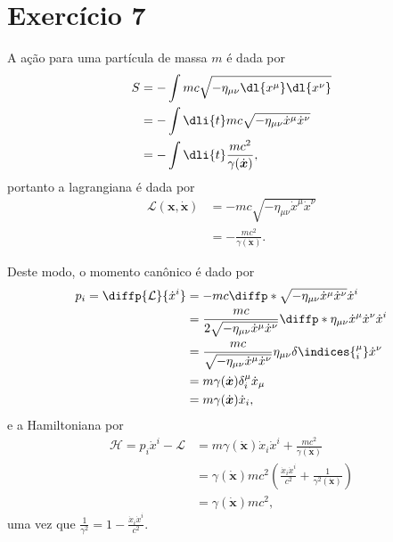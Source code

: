 \section*{Exercício 7}

A ação para uma partícula de massa \(m\) é dada por
\begin{align*}
    S &= -\int mc\sqrt{-\eta_{\mu\nu} \dl{x^\mu} \dl{x^\nu}}\\
      &= - \int \dli{t}mc \sqrt{-\eta_{\mu\nu} \dot{x}^\mu \dot{x}^\nu}\\
      &= - \int \dli{t} \frac{mc^2}{\gamma(\dot{\boldsymbol{x}})},
\end{align*}
portanto a lagrangiana é dada por
\begin{align*}
    \mathcal{L}(\boldsymbol{x}, \dot{\boldsymbol{x}}) &= - mc\sqrt{-\eta_{\mu\nu}\dot{x}^\mu\dot{x}^\nu}\\
                                        &= - \frac{mc^2}{\gamma(\dot{\boldsymbol{x}})}.
\end{align*}

Deste modo, o momento canônico é dado por
\begin{align*}
    p_i = \diffp{\mathcal{L}}{\dot{x}^i} &= -mc\diffp*{\sqrt{-\eta_{\mu\nu}\dot{x}^\mu\dot{x}^\nu}}{\dot{x}^i}\\
                                         &= \frac{mc}{2\sqrt{-\eta_{\mu\nu}\dot{x}^\mu \dot{x}^\nu}}\diffp*{\eta_{\mu\nu}\dot{x}^\mu\dot{x}^\nu}{\dot{x}^i}\\
                                         &= \frac{mc}{\sqrt{-\eta_{\mu\nu}\dot{x}^\mu\dot{x}^\nu}} \eta_{\mu\nu} \delta\indices{^\mu_i} \dot{x}^\nu\\
                                         &= m\gamma(\dot{\boldsymbol{x}}) \delta^\mu_i \dot{x}_\mu\\
                                         &= m \gamma(\dot{\boldsymbol{x}}) \dot{x}_i,
\end{align*}
e a Hamiltoniana por
\begin{align*}
    \mathcal{H} = p_i\dot{x}^i - \mathcal{L} &= m \gamma(\boldsymbol{\dot{x}}) \dot{x}_i\dot{x}^i + \frac{mc^2}{\gamma(\boldsymbol{\dot{x}})}\\
                                             &=  \gamma(\boldsymbol{\dot{x}}) mc^2\left(\frac{\dot{x}_i\dot{x}^i}{c^2} + \frac{1}{\gamma^2(\boldsymbol{\dot{x}})}\right)\\
                                             &= \gamma(\boldsymbol{\dot{x}}) mc^2,
\end{align*}
uma vez que \(\frac{1}{\gamma^2} = 1 - \frac{\dot{x}_i\dot{x}^i}{c^2}.\)

